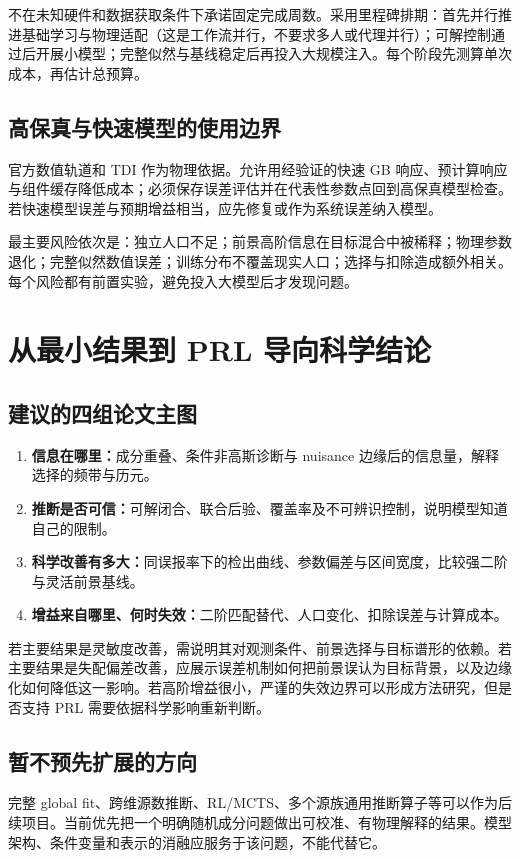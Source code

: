 \documentclass[UTF8,fontset=fandol,a4paper,11pt]{ctexart}
\numberwithin{equation}{section}
\begin{document}
不在未知硬件和数据获取条件下承诺固定完成周数。采用里程碑排期：首先并行推进基础学习与物理适配（这是工作流并行，不要求多人或代理并行）；可解控制通过后开展小模型；完整似然与基线稳定后再投入大规模注入。每个阶段先测算单次成本，再估计总预算。

\subsection{高保真与快速模型的使用边界}
官方数值轨道和 TDI 作为物理依据。允许用经验证的快速 GB 响应、预计算响应与组件缓存降低成本；必须保存误差评估并在代表性参数点回到高保真模型检查。若快速模型误差与预期增益相当，应先修复或作为系统误差纳入模型。

最主要风险依次是：独立人口不足；前景高阶信息在目标混合中被稀释；物理参数退化；完整似然数值误差；训练分布不覆盖现实人口；选择与扣除造成额外相关。每个风险都有前置实验，避免投入大模型后才发现问题。

\section{从最小结果到 PRL 导向科学结论}
\subsection{建议的四组论文主图}
\begin{enumerate}
\item \textbf{信息在哪里：}成分重叠、条件非高斯诊断与 nuisance 边缘后的信息量，解释选择的频带与历元。
\item \textbf{推断是否可信：}可解闭合、联合后验、覆盖率及不可辨识控制，说明模型知道自己的限制。
\item \textbf{科学改善有多大：}同误报率下的检出曲线、参数偏差与区间宽度，比较强二阶与灵活前景基线。
\item \textbf{增益来自哪里、何时失效：}二阶匹配替代、人口变化、扣除误差与计算成本。
\end{enumerate}

若主要结果是灵敏度改善，需说明其对观测条件、前景选择与目标谱形的依赖。若主要结果是失配偏差改善，应展示误差机制如何把前景误认为目标背景，以及边缘化如何降低这一影响。若高阶增益很小，严谨的失效边界可以形成方法研究，但是否支持 PRL 需要依据科学影响重新判断。

\subsection{暂不预先扩展的方向}
完整 global fit、跨维源数推断、RL/MCTS、多个源族通用推断算子等可以作为后续项目。当前优先把一个明确随机成分问题做出可校准、有物理解释的结果。模型架构、条件变量和表示的消融应服务于该问题，不能代替它。
\end{document}
